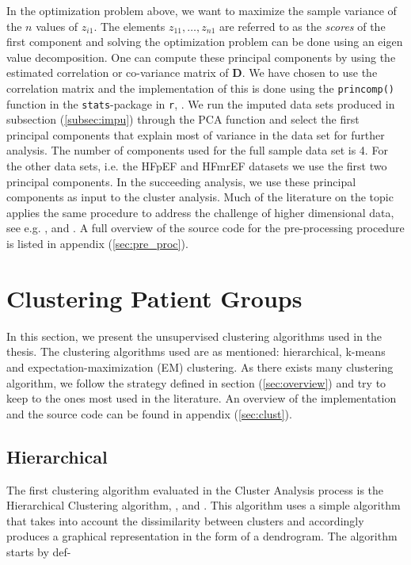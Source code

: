 \documentclass[../thesis.tex]{subfiles}
\begin{document}
\noindent In the optimization problem above, we want to maximize the sample variance of the $n$ values of $z_{i1}$. The elements $z_{11}, \hdots ,z_{n1}$ are referred to as the \textit{scores} of the first component and solving the optimization problem can be done using an eigen value decomposition. One can compute these principal components by using the estimated correlation or co-variance matrix of $\mathbf{D}$. We have chosen to use the correlation matrix and the implementation of this is done using the \texttt{princomp()} function in the \texttt{stats}-package in \texttt{r}, \citep{stats}. We run the imputed data sets produced in subsection (\ref{subsec:impu}) through the PCA function and select the first principal components that explain most of variance in the data set for further analysis. The number of components used for the full sample data set is 4. For the other data sets, i.e. the HFpEF and HFmrEF datasets we use the first two principal components. In the succeeding analysis, we use these principal components as input to the cluster analysis. Much of the literature on the topic applies the same procedure to address the challenge of higher dimensional data, see e.g. \cite{shah2014phenomapping}, \cite{ahmad2014clinical} and \cite{katz2017phenomapping}. A full overview of the source code for the pre-processing procedure is listed in appendix (\ref{sec:pre_proc}).

\section{Clustering Patient Groups}
\label{sec:cluster_pat_gro}

\noindent In this section, we present the unsupervised clustering algorithms used in the thesis. The clustering algorithms used are as mentioned: hierarchical, k-means and expectation-maximization (EM) clustering. As there exists many clustering algorithm, we follow the strategy defined in section (\ref{sec:overview}) and try to keep to the ones most used in the literature. An overview of the implementation and the source code can be found in appendix (\ref{sec:clust}).

\vspace*{-0,25cm}\subsection{Hierarchical}
\label{subsec:hierarchical}

\noindent The first clustering algorithm evaluated in the Cluster Analysis process is the Hierarchical Clustering algorithm, \cite{sibson1973slink}, \cite{defays1977efficient} and \citep{rohlf198212}. This algorithm uses a simple algorithm that takes into account the dissimilarity between clusters and accordingly produces a graphical representation in the form of a dendrogram. The algorithm starts by def-\\
\end{document}
